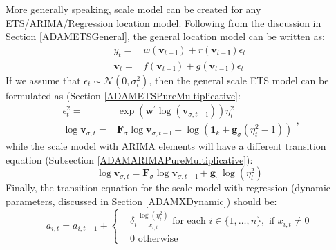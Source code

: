 \documentclass[
]{book}
\theoremstyle{definition}
\theoremstyle{definition}
\theoremstyle{definition}
\theoremstyle{definition}
\theoremstyle{remark}
\begin{document}
More generally speaking, scale model can be created for any ETS/ARIMA/Regression location model. Following from the discussion in Section \ref{ADAMETSGeneral}, the general location model can be written as:
\begin{equation*}
  \begin{aligned}
    {y}_{t} = & w(\mathbf{v}_{t-\mathbf{l}}) + r(\mathbf{v}_{t-\mathbf{l}}) \epsilon_t \\
    \mathbf{v}_{t} = & f(\mathbf{v}_{t-\mathbf{l}}) + g(\mathbf{v}_{t-\mathbf{l}}) \epsilon_t
  \end{aligned}
\end{equation*}
If we assume that \(\epsilon_t \sim \mathcal{N}(0,\sigma^2_t)\), then the general scale ETS model can be formulated as (Section \ref{ADAMETSPureMultiplicative}:
\begin{equation}
  \begin{aligned}
        \epsilon_t^2 = & \exp \left(\mathbf{w}^\prime \log(\mathbf{v}_{\sigma,t-\mathbf{l}})\right)\eta_{t}^2\\
        \log \mathbf{v}_{\sigma,t} = & \mathbf{F}_\sigma \log \mathbf{v}_{\sigma,t-\mathbf{l}} + \log(\mathbf{1}_k + \mathbf{g}_\sigma (\eta_t^2-1))
  \end{aligned},
  \label{eq:ADAMSMGeneralETS}
\end{equation}
while the scale model with ARIMA elements will have a different transition equation (Subsection \ref{ADAMARIMAPureMultiplicative}):
\begin{equation}
  \log \mathbf{v}_{\sigma,t} = \mathbf{F}_\sigma \log \mathbf{v}_{\sigma,t-\mathbf{l}} + \mathbf{g}_\sigma \log(\eta_t^2)
  \label{eq:ADAMSMGeneralARIMA}
\end{equation}
Finally, the transition equation for the scale model with regression (dynamic parameters, discussed in Section \ref{ADAMXDynamic}) should be:
\begin{equation}
  a_{i,t} = a_{i,t-1} +  \left \lbrace \begin{aligned}
                  &\delta_i \frac{\log(\eta_t^2)}{x_{i,t}} \text{ for each } i \in \{1, \dots, n\}, \text{ if } x_{i,t}\neq 0 \\
                  &0 \text{ otherwise }
            \end{aligned} \right.
  \label{eq:ADAMSMGeneralReg}
\end{equation}
\end{document}
